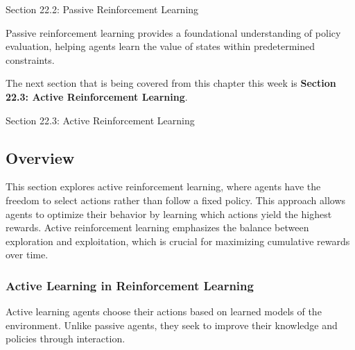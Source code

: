 \begin{notes}{Section 22.2: Passive Reinforcement Learning}
\begin{highlight}
        Passive reinforcement learning provides a foundational understanding of policy evaluation, helping agents learn the value of states within predetermined constraints.
    
    \end{highlight}
\end{notes}

The next section that is being covered from this chapter this week is \textbf{Section 22.3: Active Reinforcement Learning}.

\begin{notes}{Section 22.3: Active Reinforcement Learning}
    \subsection*{Overview}

    This section explores active reinforcement learning, where agents have the freedom to select actions rather than follow a fixed policy. This approach allows agents to optimize their behavior by learning 
    which actions yield the highest rewards. Active reinforcement learning emphasizes the balance between exploration and exploitation, which is crucial for maximizing cumulative rewards over time.
    
    \subsubsection*{Active Learning in Reinforcement Learning}
    
    Active learning agents choose their actions based on learned models of the environment. Unlike passive agents, they seek to improve their knowledge and policies through interaction.
    
    \begin{highlight}
    

\end{highlight}
\end{notes}
